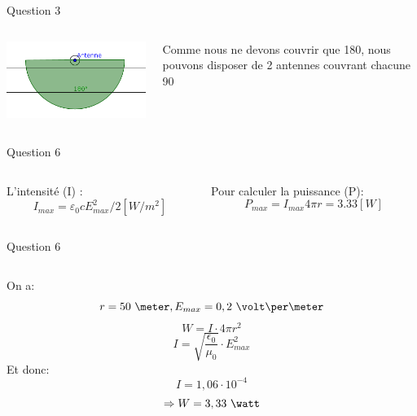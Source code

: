 \documentclass{beamer}
\begin{document}
\begin{frame}{Question 3}
	\begin{columns}
		\begin{column}{0.40\textwidth}
			\begin{center}
	    		\includegraphics[scale=0.9]{question3-2.png}
        		\end{center}
        	\end{column}
        	\begin{column}{0.40\textwidth}
	    Comme nous ne devons couvrir que \unit{180}{\degree}, nous pouvons disposer de 2 antennes couvrant chacune \unit{90}{\degree}
	   
        	\end{column}
        	\end{columns}
\end{frame}

\begin{frame}{Question 6}
	\begin{columns}
		\begin{column}{0.40\textwidth}
			\begin{center}
			L'intensité (I)  : 
			$$I_{max} = \varepsilon_0 c E_{max}^2/2 [W/m^2] $$
	    		
        		\end{center}
        	\end{column}
        	\begin{column}{0.40\textwidth}
			\begin{center}
	    Pour calculer la puissance (P):
	    $$ P_{max} = I_{max}4\pi r = 3.33 [W] $$
	    
        	\end{center}
        	\end{column}
        	\end{columns}
\end{frame}

\begin{frame}{Question 6}
	\begin{columns}
		\begin{column}{0.70\textwidth}
	    		On a:
			$$r = 50\ \meter, E_{max} = 0,2\ \volt\per\meter$$
			$$W = I \cdot 4\pi r^2$$
			$$I = \sqrt{\frac{\epsilon_0}{\mu_0}}\cdot E_{max}^2$$
			Et donc:
			$$I= 1,06\cdot10^{-4}$$
			$$\Rightarrow W = 3,33\ \watt$$
		
        		\end{column}
        	\end{columns}
\end{frame}
\end{document}
